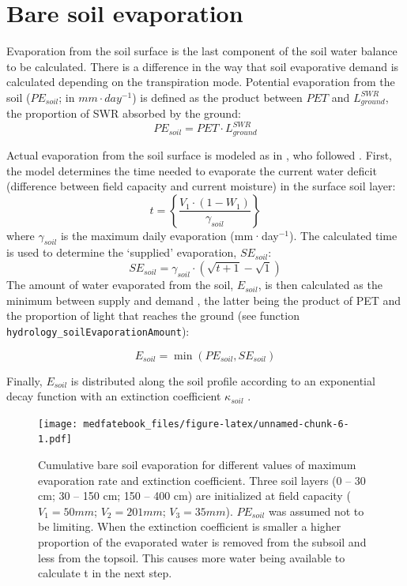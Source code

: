 \documentclass[]{book}
\begin{document}
\hypertarget{bare-soil-evaporation}{%
\section{Bare soil evaporation}\label{bare-soil-evaporation}}

Evaporation from the soil surface is the last component of the soil water balance to be calculated. There is a difference in the way that soil evaporative demand is calculated depending on the transpiration mode. Potential evaporation from the soil (\(PE_{soil}\); in \(mm\cdot day^{-1}\)) is defined as the product between \(PET\) and \(L^{SWR}_{ground}\), the proportion of SWR absorbed by the ground:
\begin{equation}
PE_{soil} =  PET\cdot L^{SWR}_{ground}
\end{equation}

Actual evaporation from the soil surface is modeled as in \citet{Mouillot2001}, who
followed \citet{Ritchie1972}. First, the model determines the time needed to evaporate
the current water deficit (difference between field capacity and current moisture)
in the surface soil layer:
\begin{equation}
t = \left \{ \frac{V_1\cdot(1- W_1)}{\gamma_{soil}} \right \}
\end{equation}
where \(\gamma_{soil}\) is the maximum daily evaporation (mm·day\(^{-1}\)). The
calculated time is used to determine the `supplied' evaporation, \(SE_{soil}\):
\begin{equation}
SE_{soil} = \gamma_{soil} \cdot (\sqrt{t+1}-\sqrt{1})
\end{equation}
The amount of water evaporated from the soil, \(E_{soil}\), is then calculated as
the minimum between supply and demand \citep{Federer1982}, the latter being the product
of PET and the proportion of light that reaches the ground (see function \texttt{hydrology\_soilEvaporationAmount}):

\begin{equation}
E_{soil} = \min(PE_{soil}, SE_{soil})
\end{equation}

Finally, \(E_{soil}\) is distributed along the soil profile according to an exponential decay function with an extinction coefficient \(\kappa_{soil}\) \citep{Mouillot2001}.

\begin{figure}
\centering
\texttt{[image: medfatebook\_files/figure-latex/unnamed-chunk-6-1.pdf]}
\caption{\label{fig:unnamed-chunk-6}Cumulative bare soil evaporation for different values of maximum evaporation rate and extinction coefficient. Three soil layers (0 -- 30 cm; 30 -- 150 cm; 150 -- 400 cm) are initialized at field capacity (\(V_1 = 50 mm\); \(V_2 = 201 mm\); \(V_3 = 35 mm\)). \(PE_{soil}\) was assumed not to be limiting. When the extinction coefficient is smaller a higher proportion of the evaporated water is removed from the subsoil and less from the topsoil. This causes more water being available to calculate t in the next step.}
\end{figure}
\end{document}
